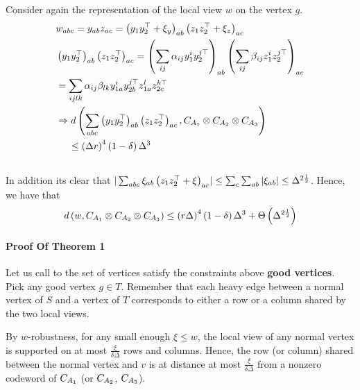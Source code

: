 \documentclass{article}
\begin{document}
\begin{multicols*}{2}
      Consider again the representation of the local view $w$ on the vertex $g$. 
      \begin{equation*}
	\begin{split}
	  & w_{abc} = y_{ab}z_{ac} = \left( y_{1}y_{2}^{\top} + \xi_{y} \right)_{ab}   \left( z_{1}z_{2}^{\top} + \xi_{z} \right)_{ac} \\ 
	  & \left( y_{1}y_{2}^{\top}\right)_{ab}\left(z_{1}z_{2}^{\top} \right)_{ac} = 
	  \left( \sum_{ij} { \alpha_{ij} y_{1}^{i}y_{2}^{j  \top}}  \right)_{ab}\left(   \sum_{ij} { \beta_{ij} z_{1}^{i}z_{2}^{j  \top}} \right)_{ac}\\ 
	  &= \sum_{ijlk} { \alpha_{ij}\beta_{lk} y_{1a}^{i}y_{2b}^{j \top}} z_{1a}^{l}z_{2c}^{k \top} \\
	  & \Rightarrow d\left( \sum_{abc} \left( y_{1}y_{2}^{\top}\right)_{ab}\left(z_{1}z_{2}^{\top} \right)_{ac} , C_{A_{1}} \otimes C_{A_{2}} \otimes C_{A_{3}} \right) \\ 
	  & \ \ \ \ \le \left( \Delta r \right)^{4} \left( 1-\delta \right)\Delta^{3} \\ & 
	\end{split}
      \end{equation*}
      In addition its clear that $ | \sum_{abc}{\xi_{ab}\left( z_{1}z_{2}^{\top} + \xi\right)_{ac}} | \le  \sum_{c}\sum_{ab}{|\xi_{ab}|} \le \Delta^{ 2\frac{1}{2}} $. Hence, we have that 
  \begin{equation*}
    \begin{split}
      d\left( w, C_{A_{1}} \otimes C_{A_{2}} \otimes C_{A_{3}}  \right) \le  \left( r\Delta \right)^{4}\left( 1 - \delta \right)\Delta^{3} + \Theta \left( \Delta^{2\frac{1}{2}}  \right)
    \end{split}
  \end{equation*}
  		
 \paragraph{Proof Of Theorem 1} Let us call to the set of vertices satisfy the constraints above \textbf{good vertices}. Pick any good vertex $g \in T$.
 Remember that each heavy edge between a normal vertex of $S$ and a vertex of $T$ corresponds to either a row or a column shared by the two local views.
 

 By $w$-robustness, for any small enough $\xi \le w $, the local view of any normal vertex is supported on at most $\frac{\xi}{\delta\Delta}$ rows and columns. 
 Hence, the row (or column) shared between the normal vertex and $v$ is at distance at most $\frac{\xi}{\delta\Delta}$ from a nonzero codeword of $C_{A_{1}}$ (or $C_{A_{2}}$, $C_{A_{3}}$).



\end{multicols*}
\end{document}
